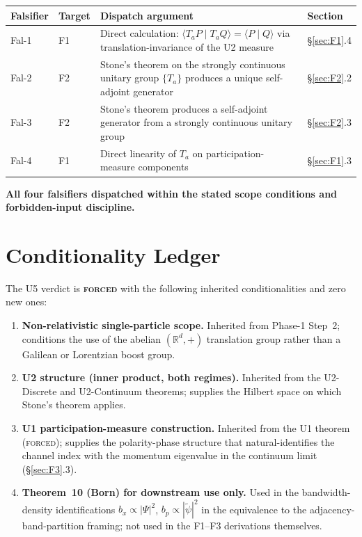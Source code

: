 \documentclass[11pt,a4paper]{article}
\begin{document}
\begin{center}
\begin{tabular}{p{2.0cm}p{1.0cm}p{8.5cm}p{1.8cm}}
\hline
Falsifier & Target & Dispatch argument & Section \\
\hline
Fal-1 & F1 & Direct calculation: $\langle T_a P \mid T_a Q \rangle = \langle P \mid Q \rangle$ via translation-invariance of the U2 measure & \S\ref{sec:F1}.4 \\
Fal-2 & F2 & Stone's theorem on the strongly continuous unitary group $\{T_a\}$ produces a unique self-adjoint generator & \S\ref{sec:F2}.2 \\
Fal-3 & F2 & Stone's theorem produces a self-adjoint generator from a strongly continuous unitary group & \S\ref{sec:F2}.3 \\
Fal-4 & F1 & Direct linearity of $T_a$ on participation-measure components & \S\ref{sec:F1}.3 \\
\hline
\end{tabular}
\end{center}

\textbf{All four falsifiers dispatched within the stated scope conditions and forbidden-input discipline.}

\section{Conditionality Ledger}\label{sec:conditionality}

The U5 verdict is \textbf{\textsc{forced}} with the following inherited conditionalities and zero new ones:

\begin{enumerate}
  \item \textbf{Non-relativistic single-particle scope.} Inherited from Phase-1 Step~2; conditions the use of the abelian $(\mathbb{R}^d, +)$ translation group rather than a Galilean or Lorentzian boost group.
  \item \textbf{U2 structure (inner product, both regimes).} Inherited from the U2-Discrete and U2-Continuum theorems; supplies the Hilbert space on which Stone's theorem applies.
  \item \textbf{U1 participation-measure construction.} Inherited from the U1 theorem (\textsc{forced}); supplies the polarity-phase structure that natural-identifies the channel index with the momentum eigenvalue in the continuum limit (\S\ref{sec:F3}.3).
  \item \textbf{Theorem~10 (Born) for downstream use only.} Used in the bandwidth-density identifications $b_x \propto |\Psi|^2$, $b_p \propto |\widetilde{\psi}|^2$ in the equivalence to the adjacency-band-partition framing; not used in the F1--F3 derivations themselves.
\end{enumerate}
\end{document}
